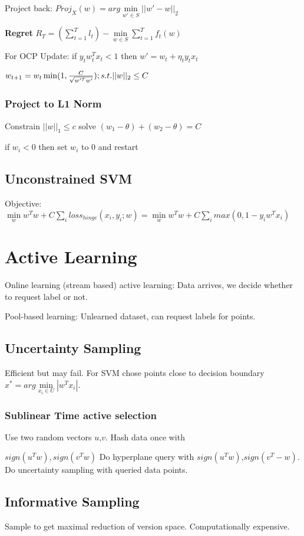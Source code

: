 \documentclass[a4paper,11pt,twocolumn]{article}
\begin{document}
Project back: $Proj_X(w) = arg \min \limits_{w' \in S} ||w' - w||_2$

\textbf{Regret} $R_T = (\sum \limits_{t=1}^T l_t) - \min \limits_{w \in S} \sum \limits_{t=1}^T f_t(w)$

For OCP Update: if $y_t w_t^T x_t < 1$ then 
$w'=w_t+\eta_t y_t x_t$

$w_{t+1} = w_t \min (1,{{C}\over{\sqrt{w'^T w'}}}); s.t. ||w||_2 \leq C$

\subsubsection{Project to L1 Norm}
Constrain $||w||_1 \leq c$ solve 
$(w_1 - \theta) + (w_2 - \theta) = C$

if $w_i < 0 $ then set $w_i$ to 0 and restart



\subsection{Unconstrained SVM}
Objective: $\min \limits_w w^T w + C \sum \limits_i loss_{hinge} (x_i,y_i;w)
= \min \limits_w w^T w + C \sum \limits_i max(0,1-y_iw^T x_i)$

\section{Active Learning}
Online learning (stream based) active learning: Data arrives, we decide whether to request label or not.

Pool-based learning: Unlearned dataset, can request labels for points.

\subsection{Uncertainty Sampling}
Efficient but may fail. For SVM chose points close to decision boundary $x^* = arg \min \limits_{x_i \in U} |w^T x_i| $. 

\subsubsection{Sublinear Time active selection}
Use two random vectors $u$,$v$. Hash data once with 

$sign(u^T w), sign(v^T w)$ Do hyperplane query with $sign(u^Tw)$,$sign(v^T -w)$. Do uncertainty sampling with queried data points.

\subsection{Informative Sampling}
Sample to get maximal reduction of version space. Computationally expensive.
\end{document}
